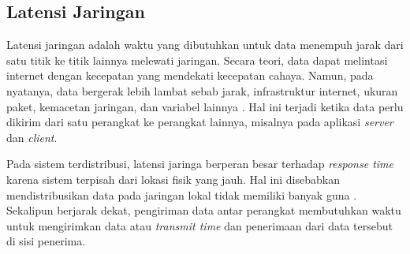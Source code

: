 \subsection{Latensi Jaringan}
\label{sec:latensi-jaringan}

Latensi jaringan adalah waktu yang dibutuhkan untuk data menempuh jarak dari satu titik ke titik lainnya melewati jaringan. Secara teori, data dapat melintasi internet dengan kecepatan yang mendekati kecepatan cahaya. Namun, pada nyatanya, data bergerak lebih lambat sebab jarak, infrastruktur internet, ukuran paket, kemacetan jaringan, dan variabel lainnya \parencite{goodwin2023latency}. Hal ini terjadi ketika data perlu dikirim dari satu perangkat ke perangkat lainnya, misalnya pada aplikasi \textit{server} dan \textit{client}.

Pada sistem terdistribusi, latensi jaringa berperan besar terhadap \textit{response time} karena sistem terpisah dari lokasi fisik yang jauh. Hal ini disebabkan mendistribusikan data pada jaringan lokal tidak memiliki banyak guna \parencite{johansson2000impact}. Sekalipun berjarak dekat, pengiriman data antar perangkat membutuhkan waktu untuk mengirimkan data atau \textit{transmit time} dan penerimaan dari data tersebut di sisi penerima.
